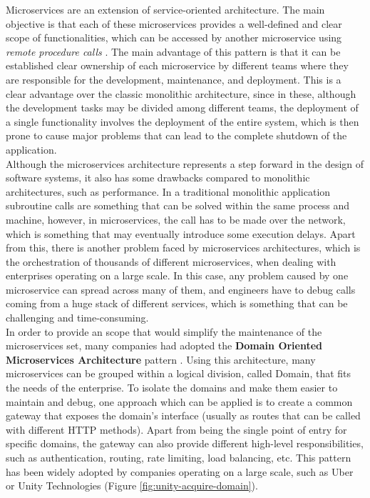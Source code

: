 \documentclass[english, 12pt, a4paper, sci, utf8, a-1b, online]{aaltothesis}
\begin{document}
Microservices are an extension of service-oriented architecture. The main objective is that each of these microservices provides a well-defined and clear scope of functionalities, which can be accessed by another microservice using \textit{remote procedure calls} \cite{nelson1981remote}. The main advantage of this pattern is that it can be established clear ownership of each microservice by different teams where they are responsible for the development, maintenance, and deployment. This is a clear advantage over the classic monolithic architecture, since in these, although the development tasks may be divided among different teams, the deployment of a single functionality involves the deployment of the entire system, which is then prone to cause major problems that can lead to the complete shutdown of the application.\\

Although the microservices architecture represents a step forward in the design of software systems, it also has some drawbacks compared to monolithic architectures, such as performance. In a traditional monolithic application subroutine calls are something that can be solved within the same process and machine, however, in microservices, the call has to be made over the network, which is something that may eventually introduce some execution delays. Apart from this, there is another problem faced by microservices architectures, which is the orchestration of thousands of different microservices, when dealing with enterprises operating on a large scale. In this case, any problem caused by one microservice can spread across many of them, and engineers have to debug calls coming from a huge stack of different services, which is something that can be challenging and time-consuming.\\

In order to provide an scope that would simplify the maintenance of the microservices set, many companies had adopted the \textbf{Domain Oriented Microservices Architecture} pattern \cite{DOMAUber}. Using this architecture, many microservices can be grouped within a logical division, called Domain, that fits the needs of the enterprise. To isolate the domains and make them easier to maintain and debug, one approach which can be applied is to create a common gateway that exposes the domain's interface (usually as routes that can be called with different HTTP methods). Apart from being the single point of entry for specific domains, the gateway can also provide different high-level responsibilities, such as authentication, routing, rate limiting, load balancing, etc. This pattern has been widely adopted by companies operating on a large scale, such as Uber \cite{GatewayUber} or Unity Technologies (Figure \ref{fig:unity-acquire-domain}).\\
\end{document}

